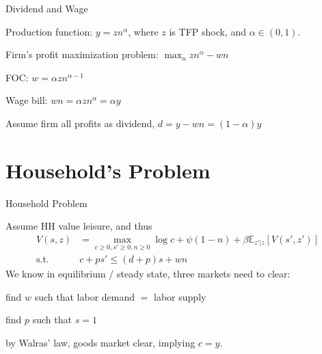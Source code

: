 \documentclass[aspectratio=169,xcolor=dvipsnames]{beamer}
\let\tempone\itemize
\let\temptwo\enditemize
\renewenvironment{itemize}{\tempone\addtolength{\itemsep}{\fill}}{\temptwo}
\let\tempa\enumerate
\let\tempb\endenumerate
\renewenvironment{enumerate}{\tempa\addtolength{\itemsep}{\fill}}{\tempb}
\begin{document}
\begin{frame}{Dividend and Wage}
\label{slide:Dividend_and_Wage}
\begin{itemize}
    \item Production function: $ \displaystyle y = z n^{\alpha} $, where $ z $ is TFP shock, and $ \alpha \in (0, 1) $.
    \item Firm's profit maximization problem: $ \displaystyle \max_{n} z n^{\alpha} - wn $
    \begin{itemize}
        \item FOC: $ \displaystyle w = \alpha z n ^{\alpha - 1} $
    \end{itemize}
    \item Wage bill: $ \displaystyle w n = \alpha z n ^{\alpha} = \alpha y $
    \item Assume firm all profits as dividend, $ \displaystyle d = y - wn = (1-\alpha)y $
\end{itemize}

\end{frame}

\section[Household]{Household's Problem}
\label{sec:Household_s_Problem}

\begin{frame}{Household Problem}
\label{slide:Household_Problem}

Assume HH value leisure, and thus
%
\begin{align}
    V(s, z)
        & = \max_{c\ge 0, s'\ge 0, n \ge 0} \log c + \psi (1-n) + \beta \mathbb{E}_{z'|z} [V(s', z')]
    \\
    \text{s.t. } \quad
        & c + p s' \le (d + p) s + wn
\end{align}
%
We know in equilibrium / steady state, three markets need to clear:
\begin{enumerate}
    \item find $ w $ such that labor demand $ = $ labor supply
    \item find $ p $ such that $ s = 1 $
    \item by Walras' law, goods market clear, implying $ c = y $.
\end{enumerate}

\end{frame}
\end{document}

